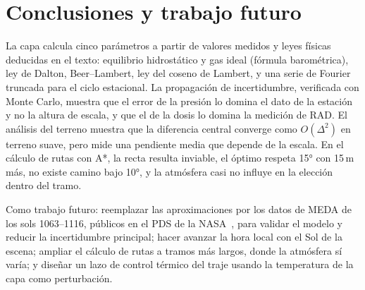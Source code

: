 \documentclass[conference]{IEEEtran}
\begin{document}
\section{Conclusiones y trabajo futuro}
La capa calcula cinco parámetros a partir de valores medidos y leyes físicas deducidas en el texto: equilibrio hidrostático y gas ideal (fórmula barométrica), ley de Dalton, Beer--Lambert, ley del coseno de Lambert, y una serie de Fourier truncada para el ciclo estacional. La propagación de incertidumbre, verificada con Monte Carlo, muestra que el error de la presión lo domina el dato de la estación y no la altura de escala, y que el de la dosis lo domina la medición de RAD. El análisis del terreno muestra que la diferencia central converge como $O(\Delta^2)$ en terreno suave, pero mide una pendiente media que depende de la escala. En el cálculo de rutas con A*, la recta resulta inviable, el óptimo respeta 15° con 15\,m más, no existe camino bajo 10°, y la atmósfera casi no influye en la elección dentro del tramo.

Como trabajo futuro: reemplazar las aproximaciones por los datos de MEDA de los sols 1063--1116, públicos en el PDS de la NASA~\cite{nasa_pds_meda}, para validar el modelo y reducir la incertidumbre principal; hacer avanzar la hora local con el Sol de la escena; ampliar el cálculo de rutas a tramos más largos, donde la atmósfera sí varía; y diseñar un lazo de control térmico del traje usando la temperatura de la capa como perturbación.
\end{document}
